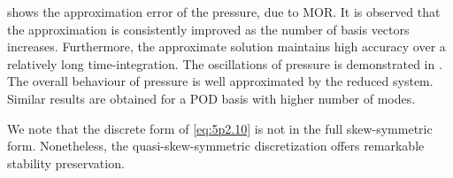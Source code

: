  shows the approximation error of the pressure, due to MOR. It is observed that the approximation is consistently improved as the number of basis vectors increases. Furthermore, the approximate solution maintains high accuracy over a relatively long time-integration. The oscillations of pressure is demonstrated in . The overall behaviour of pressure is well approximated by the reduced system. Similar results are obtained for a POD basis with higher number of modes.

We note that the discrete form of \eqref{eq:5p2.10} is not in the full skew-symmetric form. Nonetheless, the quasi-skew-symmetric discretization offers remarkable stability preservation.
